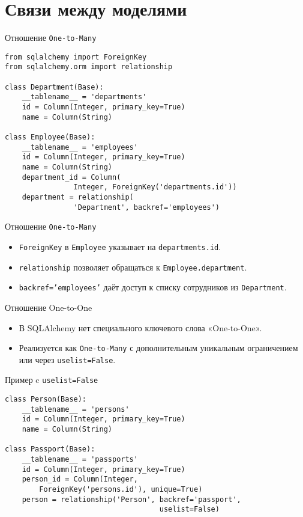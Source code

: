 \documentclass{beamer}
\begin{document}
\section{Связи между моделями}

\begin{frame}[fragile]{Отношение \texttt{One-to-Many}}
	\begin{verbatim}
from sqlalchemy import ForeignKey
from sqlalchemy.orm import relationship

class Department(Base):
    __tablename__ = 'departments'
    id = Column(Integer, primary_key=True)
    name = Column(String)

class Employee(Base):
    __tablename__ = 'employees'
    id = Column(Integer, primary_key=True)
    name = Column(String)
    department_id = Column(
                Integer, ForeignKey('departments.id'))
    department = relationship(
                'Department', backref='employees')
\end{verbatim}
\end{frame}

\begin{frame}[fragile]{Отношение \texttt{One-to-Many}}
	\begin{itemize}
		\item \texttt{ForeignKey} в \texttt{Employee} указывает на \texttt{departments.id}.
		\item \texttt{relationship} позволяет обращаться к \texttt{Employee.department}.
		\item \texttt{backref='employees'} даёт доступ к списку сотрудников из \texttt{Department}.
	\end{itemize}
\end{frame}

\begin{frame}[fragile]{Отношение One-to-One}
	\begin{itemize}
		\item В SQLAlchemy нет специального ключевого слова «One-to-One».
		\item Реализуется как \texttt{One-to-Many} с дополнительным уникальным ограничением или через \texttt{uselist=False}.
	\end{itemize}

	\begin{block}{Пример c \texttt{uselist=False}}
		\begin{verbatim}
class Person(Base):
    __tablename__ = 'persons'
    id = Column(Integer, primary_key=True)
    name = Column(String)

class Passport(Base):
    __tablename__ = 'passports'
    id = Column(Integer, primary_key=True)
    person_id = Column(Integer,
        ForeignKey('persons.id'), unique=True)
    person = relationship('Person', backref='passport',
                                    uselist=False)
\end{verbatim}
	\end{block}
\end{frame}
\end{document}
